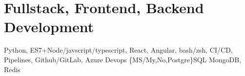\section{Fullstack, Frontend, Backend Development}
  {Python, ES7+Node/javscript/typescript, React, Angular, bash/zsh,  }
 { CI/CD, Pipelines, Github/GitLab, Azure Devops}
 {\{MS/My,No,Postgre\}SQL MongoDB, Redis}
